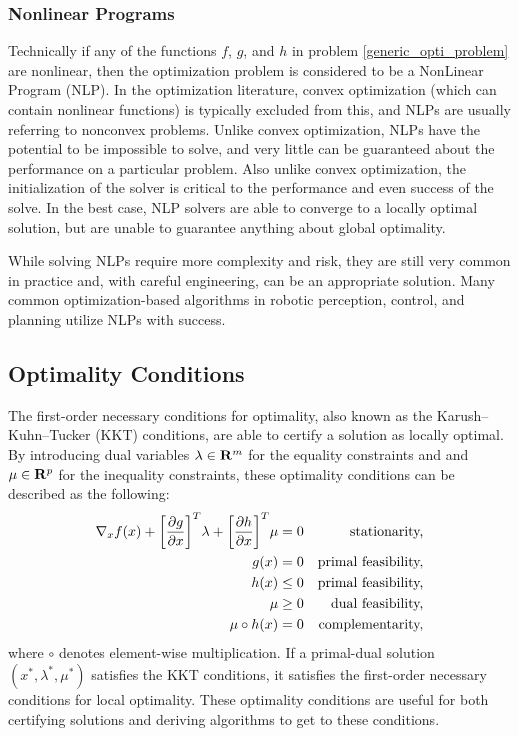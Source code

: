\subsubsection{Nonlinear Programs}
%
Technically if any of the functions $f$, $g$, and $h$ in problem \eqref{generic_opti_problem} are nonlinear, then the optimization problem is considered to be a NonLinear Program (NLP). In the optimization literature, convex optimization (which can contain nonlinear functions) is typically excluded from this, and NLPs are usually referring to nonconvex problems. Unlike convex optimization, NLPs have the potential to be impossible to solve, and very little can be guaranteed about the performance on a particular problem. Also unlike convex optimization, the initialization of the solver is critical to the performance and even success of the solve. In the best case, NLP solvers are able to converge to a locally optimal solution, but are unable to guarantee anything about global optimality.

While solving NLPs require more complexity and risk, they are still very common in practice and, with careful engineering, can be an appropriate solution. Many common optimization-based algorithms in robotic perception, control, and planning utilize NLPs with success.
%
\subsection{Optimality Conditions}
\label{sec:background:kkt}
%
The first-order necessary conditions for optimality, also known as the Karush–Kuhn–Tucker (KKT) conditions, are able to certify a solution as locally optimal. By introducing dual variables $\lambda \in \mathbf{R}^{m}$ for the equality constraints and and $\mu \in \mathbf{R}^{p}$ for the inequality constraints, these optimality conditions can be described as the following:
%
\begin{align}
    \nabla_x f(x) + \bigg[ \frac{\partial { g }}{ \partial { x }} \bigg] ^T \lambda + \bigg[ \frac{\partial { h }}{ \partial { x }} \bigg] ^T \mu &= 0 & \text{stationarity,} \\
    g(x) &= 0 & \text{primal feasibility,} \\
    h(x) &\leq 0 & \text{primal feasibility,} \\
    \mu & \geq 0 & \text{dual feasibility,} \\
    \mu \circ h(x) &= 0 & \text{complementarity,}
\end{align}
%
where $\circ$ denotes element-wise multiplication. If a primal-dual solution $(x^*, \lambda^*, \mu^*)$ satisfies the KKT conditions, it satisfies the first-order necessary conditions for local optimality. These optimality conditions are useful for both certifying solutions and deriving algorithms to get to these conditions.
%
